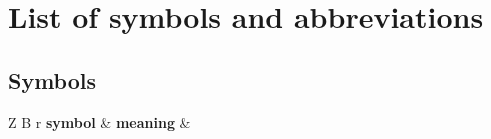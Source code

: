 

\renewcommand{\arraystretch}{1.2}	
{ %
	
	\setlength\LTleft{0pt}
	\setlength\LTright{0pt}
	
	
	\chapter{List of symbols and abbreviations}
	
	\section*{Symbols}
	
	\begin{longtable}{Z B r}
		\textbf{symbol} & \textbf{meaning}         &  \\
		\addlinespace
		\endhead
		

\end{longtable}}
